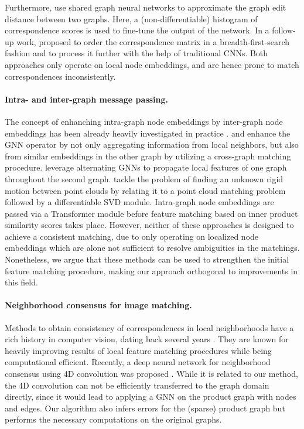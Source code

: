 \documentclass{article}
\begin{document}
Furthermore, \citet{Bai/etal/2019} use shared graph neural networks to approximate the graph edit distance between two graphs.
Here, a (non-differentiable) histogram of correspondence scores is used to fine-tune the output of the network.
In a follow-up work, \citet{Bai/etal/2018} proposed to order the correspondence matrix in a breadth-first-search fashion and to process it further with the help of traditional CNNs.
Both approaches only operate on local node embeddings, and are hence prone to match correspondences inconsistently.

\paragraph{Intra- and inter-graph message passing.}

The concept of enhanching intra-graph node embeddings by inter-graph node embeddings has been already heavily investigated in practice \citep{Li/etal/2019,Wang/etal/2019,Xu/etal/2019a}.
\citet{Li/etal/2019} and \citet{Wang/etal/2019} enhance the GNN operator by not only aggregating information from local neighbors, but also from similar embeddings in the other graph by utilizing a cross-graph matching procedure.
\citet{Xu/etal/2019a} leverage alternating GNNs to propagate local features of one graph throughout the second graph.
\citet{Wang/Solomon/2019} tackle the problem of finding an unknown rigid motion between point clouds by relating it to a point cloud matching problem followed by a differentiable SVD module.
Intra-graph node embeddings are passed via a Transformer module before feature matching based on inner product similarity scores takes place.
However, neither of these approaches is designed to achieve a consistent matching, due to only operating on localized node embeddings which are alone not sufficient to resolve ambiguities in the matchings.
Nonetheless, we argue that these methods can be used to strengthen the initial feature matching procedure, making our approach orthogonal to improvements in this field.

\paragraph{Neighborhood consensus for image matching.}

Methods to obtain consistency of correspondences in local neighborhoods have a rich history in computer vision, dating back several years \citep{Sattler/etal/2009,Sivic/Zisserman/2003,Schmid/Mohr/1997}.
They are known for heavily improving results of local feature matching procedures while being computational efficient.
Recently, a deep neural network for neighborhood consensus using 4D convolution was proposed \citep{Rocco/etal/2018}.
While it is related to our method, the 4D convolution can not be efficiently transferred to the graph domain directly, since it would lead to applying a GNN on the product graph with  nodes and  edges.
Our algorithm also infers errors for the (sparse) product graph but performs the necessary computations on the original graphs.
\end{document}
